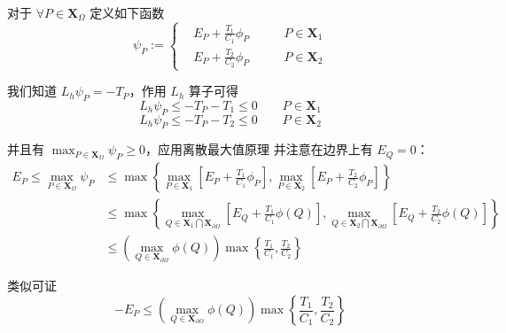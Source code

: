 \documentclass[a4paper]{article}
\begin{document}
\par 对于 $\forall P \in \mathbf{X}_{\Omega}$ 定义如下函数
\begin{equation}
    \psi_{P} :=
    \left\{
        \begin{aligned}
            &E_P+\frac{T_1}{C_1}\phi_{P} \qquad & P \in \mathbf{X}_{1} \\
            &E_P+\frac{T_2}{C_2}\phi_{P} \qquad & P \in \mathbf{X}_{2}
        \end{aligned}
    \right.
\end{equation}
\par 我们知道 $L_h\psi_{P} = -T_P$，作用 $L_h$ 算子可得
\begin{equation}
    L_h\psi_{P} \leq
    -T_P - T_1
    \leq 0
    \qquad
    P \in \mathbf{X}_{1}
\end{equation}
\begin{equation}
    L_h\psi_{P} \leq
    -T_P - T_2
    \leq 0
    \qquad
    P \in \mathbf{X}_{2}
\end{equation}
\par 并且有 $\max_{P\in \mathbf{X}_{\Omega}} \psi_{P}\geq0$，应用离散最大值原理
并注意在边界上有 $E_Q=0$：
\begin{equation}
    \begin{aligned}
        E_P\leq \max_{P \in \mathbf{X}_{\Omega}} \psi_{P} 
        &\leq \max \left\{
            \max_{P \in \mathbf{X}_{1}}\left[E_P+\frac{T_1}{C_1} \phi_{P}\right], 
            \max_{P \in \mathbf{X}_{2}}\left[E_P+\frac{T_2}{C_2} \phi_{P}\right]
        \right\}\\
        &\leq \max \left\{
            \max_{Q \in \mathbf{X}_{1}\bigcap \mathbf{X}_{\partial\Omega}}\left[E_Q+\frac{T_1}{C_1} \phi(Q)\right], 
            \max_{Q \in \mathbf{X}_{2}\bigcap \mathbf{X}_{\partial\Omega}}\left[E_Q+\frac{T_2}{C_2} \phi(Q)\right]
        \right\}\\
        &\leq \left(
            \max_{Q \in \mathbf{X}_{\partial\Omega}} \phi(Q)
        \right)
        \max \left\{
            \frac{T_1}{C_1}, \frac{T_2}{C_2}
        \right\}
    \end{aligned}
\end{equation}
\par 类似可证
\begin{equation}
    -E_P\leq
    \left(
        \max_{Q \in \mathbf{X}_{\partial\Omega}} \phi(Q)
    \right)
    \max \left\{
        \frac{T_1}{C_1}, \frac{T_2}{C_2}
    \right\}
\end{equation}


\printbibliography
\end{document}
